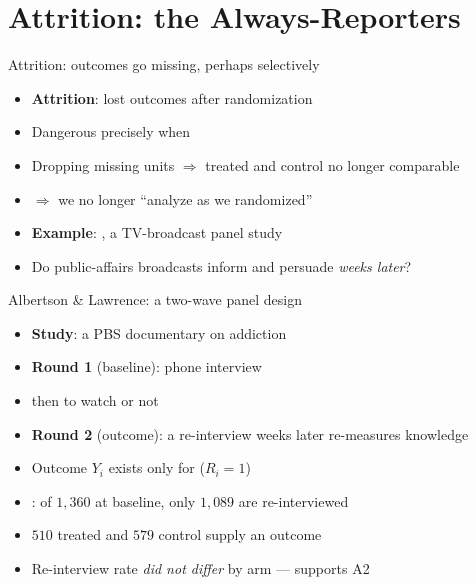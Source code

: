 \documentclass[table, xcolor = {dvipsnames}, 9pt]{beamer}
\theoremstyle{plain}
\newcommand{\mh}[1]{{\color{magenta}{#1}}}
\begin{document}
\section{Attrition: the Always-Reporters}

\begin{frame}[t]{Attrition: outcomes go missing, perhaps selectively}
\vfill
\begin{itemize} \vfill
\item \textbf{Attrition}: lost outcomes after randomization \citep{gerbergreen2012} \vfill
\item Dangerous precisely when \mh{treatment affects reporting} \vfill
\item Dropping missing units $\Rightarrow$ treated and control no longer comparable \vfill
\item[] $\Rightarrow$ we no longer ``analyze as we randomized'' \vfill
\item \textbf{Example}: \citet{albertsonlawrence2009}, a TV-broadcast panel study \vfill
\item[] Do public-affairs broadcasts inform and persuade \emph{weeks later}? \vfill
\end{itemize} \vfill
\end{frame}
\begin{frame}[t]{Albertson \& Lawrence: a two-wave panel design}
\vfill
\begin{itemize} \vfill
\item \textbf{Study}: a PBS documentary on addiction \citep{albertsonlawrence2009} \vfill
\item \textbf{Round 1} (baseline): phone interview \vfill
\item[] then \mh{randomly assigned} to watch or not \vfill
\item \textbf{Round 2} (outcome): a re-interview weeks later re-measures knowledge \vfill
\item Outcome $Y_i$ exists only for \mh{Round-2 respondents} ($R_i = 1$) \vfill
\item \mh{Attrition}: of $1{,}360$ at baseline, only $1{,}089$ are re-interviewed \vfill
\item[] $510$ treated and $579$ control supply an outcome \vfill
\item Re-interview rate \emph{did not differ} by arm --- supports A2 \vfill
\end{itemize} \vfill
\end{frame}
\end{document}
